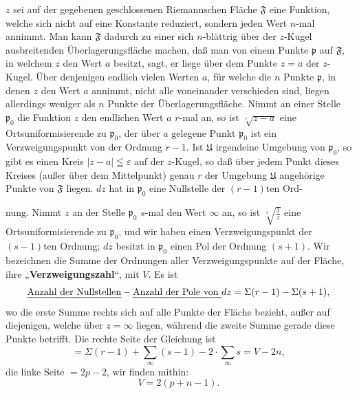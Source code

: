 \documentclass{article}
\begin{document}
$z$ sei auf der gegebenen geschlossenen Riemannschen Fläche $\mathfrak{F}$ eine Funktion, welche sich nicht auf eine Konstante reduziert, sondern jeden Wert $n$-mal annimmt. Man kann $\mathfrak{F}$ dadurch zu einer sich $n$-blättrig über der $z$-Kugel ausbreitenden Überlagerungsfläche machen, daß man von einem Punkte $\mathfrak{p}$ auf $\mathfrak{F}$, in welchem $z$ den Wert $a$ besitzt, sagt, er liege über dem Punkte $z = a$ der $z$-Kugel. Über denjenigen endlich vielen Werten $a$, für welche die $n$ Punkte $\mathfrak{p}$, in denen $z$ den Wert $a$ annimmt, nicht alle voneinander verschieden sind, liegen allerdings weniger als $n$ Punkte der Überlagerungsfläche. Nimmt an einer Stelle $\mathfrak{p}_0$ die Funktion $z$ den endlichen Wert $a$ $r$-mal an, so ist $\sqrt[r]{z - a}$ eine Ortsuniformisierende zu $\mathfrak{p}_0$, der über $a$ gelegene Punkt $\mathfrak{p}_0$ ist ein Verzweigungspunkt von der Ordnung $r - 1$. Ist $\mathfrak{U}$ irgendeine Umgebung von $\mathfrak{p}_0$, so gibt es einen Kreis $|z - a| \leqq \varepsilon$ auf der $z$-Kugel, so daß über jedem Punkt dieses Kreises (außer über dem Mittelpunkt) genau $r$ der Umgebung $\mathfrak{U}$ angehörige Punkte von $\mathfrak{F}$ liegen. $dz$ hat in $\mathfrak{p}_0$ eine Nullstelle der $(r - 1)$ten Ord-

nung. Nimmt $z$ an der Stelle $\mathfrak{p}_0$ $s$-mal den Wert $\infty$ an, so ist $\sqrt[s]{\frac{1}{z}}$ eine Ortsuniformisierende zu $\mathfrak{p}_0$, und wir haben einen Verzweigungspunkt der $(s - 1)$ten Ordnung; $dz$ besitzt in $\mathfrak{p}_0$ einen Pol der Ordnung $(s + 1)$. Wir bezeichnen die Summe der Ordnungen aller Verzweigungspunkte auf der Fläche, ihre „\textbf{Verzweigungszahl}“, mit $V$. Es ist
\[ \text{\emph{Anzahl der Nullstellen}} - \text{\emph{Anzahl der Pole von }} dz = \Sigma(r - 1) - \Sigma(s + 1), \]
wo die erste Summe rechts sich auf alle Punkte der Fläche bezieht, außer auf diejenigen, welche über $z = \infty$ liegen, während die zweite Summe gerade diese Punkte betrifft. Die rechte Seite der Gleichung ist
\[ = \Sigma(r - 1) + \sum_\infty (s - 1) - 2 \cdot \sum_\infty s = V - 2n, \]
die linke Seite $= 2p - 2$, wir finden mithin:
\[ V = 2(p + n - 1). \]
\end{document}
